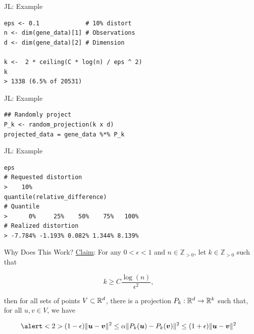 \documentclass[14pt]{beamer}
\begin{document}
\begin{frame}[fragile]{JL: Example}
  \begin{lstlisting}
eps <- 0.1             # 10% distort
n <- dim(gene_data)[1] # Observations
d <- dim(gene_data)[2] # Dimension

k <-  2 * ceiling(C * log(n) / eps ^ 2)
k
> 1338 (6.5% of 20531)
  \end{lstlisting}
\end{frame}

\begin{frame}[fragile]{JL: Example}
  \begin{lstlisting}
## Randomly project
P_k <- random_projection(k x d)
projected_data = gene_data %*% P_k
  \end{lstlisting}
\end{frame}

\begin{frame}[fragile]{JL: Example}
  \begin{lstlisting}
eps
# Requested distortion
>    10%
quantile(relative_difference)
# Quantile
>      0%     25%    50%    75%   100%
# Realized distortion
> -7.784% -1.193% 0.082% 1.344% 8.139%
  \end{lstlisting}
\end{frame}

\begin{frame}{Why Does This Work?}
  \underline{Claim}: For any $0<\epsilon<1$ and $n\in\mathbb{Z}_{>0}$, let
  $k\in\mathbb{Z}_{>0}$ such that

  \begin{equation*}
    k \geq C \frac{\log(n)}{\epsilon^2},
  \end{equation*}

  \noindent then for all sets of points $V\subset\mathbb{R}^{d}$, there is a projection
  $P_k:\mathbb{R}^{d}\to\mathbb{R}^{k}$ such that, for all $u,v\in V$, we have

    \begin{equation*}
      \alert<2>{(1 - \epsilon)\|\vu - \vv\|^2 \leq \alpha\|P_k(\vu) - P_k(\vv)\|^2 \leq %
      (1 + \epsilon)\|\vu - \vv\|^2
}    \end{equation*}
\end{frame}
\end{document}
